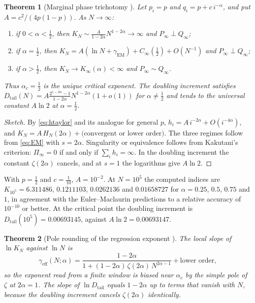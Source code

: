 \documentclass[11pt,reqno]{amsart}
\theoremstyle{plain}
\newtheorem{theorem}{Theorem}[section]
\theoremstyle{definition}
\theoremstyle{remark}
\numberwithin{equation}{section}
\newcommand{\gEM}{\gamma_{\mathrm{EM}}}
\begin{document}
\begin{theorem}[Marginal phase trichotomy \cite{ChenChen2026I}]\label{thm:trichotomy}
Let $p_i=p$ and $q_i=p+c\,i^{-\alpha}$, and put $A=c^2/(4p(1-p))$. As $N\to\infty$:
\begin{enumerate}[label=\textup{(\arabic*)},leftmargin=*]
\item if $0<\alpha<\tfrac12$, then $K_N\sim\frac{A}{1-2\alpha}N^{1-2\alpha}\to\infty$ and $P_\infty\perp Q_\infty$;
\item if $\alpha=\tfrac12$, then $K_N=A(\ln N+\gEM)+C_\infty(\tfrac12)+O(N^{-1})$ and $P_\infty\perp Q_\infty$;
\item if $\alpha>\tfrac12$, then $K_N\to K_\infty(\alpha)<\infty$ and $P_\infty\sim Q_\infty$.
\end{enumerate}
Thus $\alpha_c=\tfrac12$ is the unique critical exponent. The doubling increment satisfies $D_{\mathrm{tail}}(N)=A\frac{2^{1-2\alpha}-1}{1-2\alpha}N^{1-2\alpha}(1+o(1))$ for $\alpha\ne\tfrac12$ and tends to the universal constant $A\ln2$ at $\alpha=\tfrac12$.
\end{theorem}

\begin{proof}[Sketch]
By \eqref{eq:htaylor} and its analogue for general $p$, $h_i=A\,i^{-2\alpha}+O(i^{-4\alpha})$, and $K_N=A\,H_N(2\alpha)+\text{(convergent or lower order)}$. The three regimes follow from \eqref{eq:EM} with $s=2\alpha$. Singularity or equivalence follows from Kakutani's criterion: $\Pi_\infty=0$ if and only if $\sum_ih_i=\infty$. In the doubling increment the constant $\zeta(2\alpha)$ cancels, and at $s=1$ the logarithms give $A\ln2$.
\end{proof}

With $p=\tfrac12$ and $c=\tfrac1{10}$, $A=10^{-2}$. At $N=10^5$ the computed indices are $K_{10^5}=6.311486$, $0.1211103$, $0.0262136$ and $0.01658727$ for $\alpha=0.25$, $0.5$, $0.75$ and $1$, in agreement with the Euler--Maclaurin predictions to a relative accuracy of $10^{-10}$ or better. At the critical point the doubling increment is $D_{\mathrm{tail}}(10^5)=0.00693145$, against $A\ln2=0.00693147$.

\begin{theorem}[Pole rounding of the regression exponent \cite{ChenChen2026I}]\label{thm:fss}
The local slope of $\ln K_N$ against $\ln N$ is
\begin{equation}\label{eq:geff}
\gamma_{\mathrm{eff}}(N;\alpha)=\frac{1-2\alpha}{1+(1-2\alpha)\,\zeta(2\alpha)\,N^{2\alpha-1}}+\text{lower order},
\end{equation}
so the exponent read from a finite window is biased near $\alpha_c$ by the simple pole of $\zeta$ at $2\alpha=1$. The slope of $\ln D_{\mathrm{tail}}$ equals $1-2\alpha$ up to terms that vanish with $N$, because the doubling increment cancels $\zeta(2\alpha)$ identically.
\end{theorem}
\end{document}
